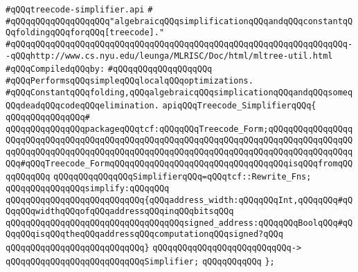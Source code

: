 \label{src/lib/compiler/back/low/treecode/treecode-simplifier.api}
\verb|#qQQqtreecode-simplifier.api|\newline
\verb|#|\newline
\verb|#qQQqqQQqqQQqqQQqqQQq"algebraicqQQqsimplificationqQQqandqQQqconstantqQQqfoldingqQQqforqQQq[treecode]."|\newline
\verb|#qQQqqQQqqQQqqQQqqQQqqQQqqQQqqQQqqQQqqQQqqQQqqQQqqQQqqQQqqQQqqQQqqQQq--qQQqhttp://www.cs.nyu.edu/leunga/MLRISC/Doc/html/mltree-util.html|\newline
\newline
\verb|#qQQqCompiledqQQqby:|\newline
\verb|#qQQqqQQqqQQqqQQqqQQq|\newline
\newline
\verb|#qQQqPerformsqQQqsimpleqQQqlocalqQQqoptimizations.|\newline
\verb|#qQQqConstantqQQqfolding,qQQqalgebraicqQQqsimplicationqQQqandqQQqsomeqQQqdeadqQQqcodeqQQqelimination.|\newline
\newline
\verb|apiqQQqTreecode_SimplifierqQQq{|\newline
\verb|qQQqqQQqqQQqqQQq#|\newline
\verb|qQQqqQQqqQQqqQQqpackageqQQqtcf:qQQqqQQqTreecode_Form;qQQqqQQqqQQqqQQqqQQqqQQqqQQqqQQqqQQqqQQqqQQqqQQqqQQqqQQqqQQqqQQqqQQqqQQqqQQqqQQqqQQqqQQqqQQqqQQqqQQqqQQqqQQqqQQqqQQqqQQqqQQqqQQqqQQqqQQqqQQqqQQqqQQqqQQqqQQqqQQq#qQQqTreecode_FormqQQqqQQqqQQqqQQqqQQqqQQqqQQqqQQqqQQqisqQQqfromqQQqqQQqqQQq|\newline
\newline
\verb|qQQqqQQqqQQqqQQqSimplifierqQQq=qQQqtcf::Rewrite_Fns;|\newline
\newline
\verb|qQQqqQQqqQQqqQQqsimplify:qQQqqQQq|\newline
\verb|qQQqqQQqqQQqqQQqqQQqqQQqqQQq{qQQqaddress_width:qQQqqQQqInt,qQQqqQQq#qQQqqQQqwidthqQQqofqQQqaddressqQQqinqQQqbitsqQQq|\newline
\verb|qQQqqQQqqQQqqQQqqQQqqQQqqQQqqQQqqQQqsigned_address:qQQqqQQqBoolqQQq#qQQqqQQqisqQQqtheqQQqaddressqQQqcomputationqQQqsigned?qQQq|\newline
\verb|qQQqqQQqqQQqqQQqqQQqqQQqqQQq}|\newline
\verb|qQQqqQQqqQQqqQQqqQQqqQQqqQQq->|\newline
\verb|qQQqqQQqqQQqqQQqqQQqqQQqqQQqSimplifier;|\newline
\verb|qQQqqQQqqQQq|\newline
\verb|};|\newline

